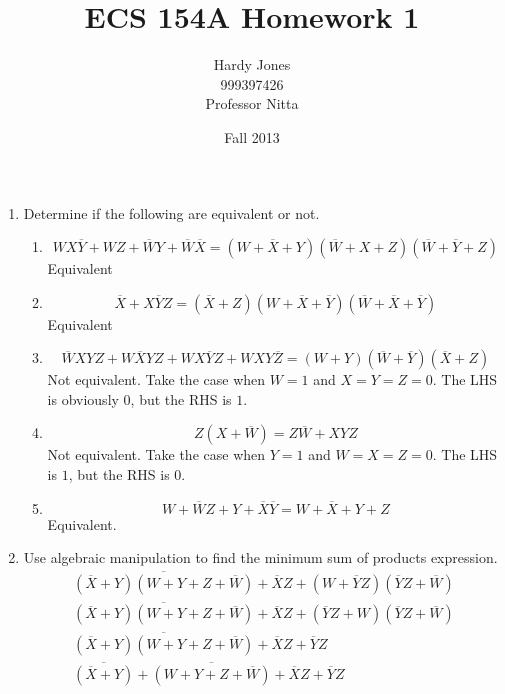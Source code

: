 \documentclass[12pt,letterpaper]{article}
\title{ECS 154A Homework 1\vspace{-2ex}}
\author{Hardy Jones\\
        999397426\\
        Professor Nitta\vspace{-2ex}}
\date{Fall 2013}
\begin{document}
  \maketitle

  \begin{enumerate}
    \item
      Determine if the following are equivalent or not.
      \begin{enumerate}
        \item
          \[
            WX\overline{Y} + WZ + \overline{W}Y + \overline{W} \overline{X} =
            (W + \overline{X} + Y)(\overline{W} + X + Z)(\overline{W} + \overline{Y} + Z)
          \]
          Equivalent
        \item
          \[
            \overline{X} + X\overline{Y}Z =
            (\overline{X} + Z)(W + \overline{X} + \overline{Y})(\overline{W} + \overline{X} + \overline{Y})
          \]
          Equivalent
        \item
          \[
            \overline{W}XYZ + W\overline{X}YZ + WX\overline{Y}Z + WXY\overline{Z} =
            (W + Y)(\overline{W} + \overline{Y})(\overline{X} + Z)
          \]
          Not equivalent.
          Take the case when $W = 1$ and $X = Y = Z = 0$.
          The LHS is obviously $0$, but the RHS is $1$.
        \item
          \[
            Z(X + \overline{W}) = Z\overline{W} + XYZ
          \]
          Not equivalent.
          Take the case when $Y = 1$ and $W = X = Z = 0$.
          The LHS is $1$, but the RHS is $0$.
        \item
          \[
            W + \overline{W}Z + Y + \overline{X}\overline{Y} = W + \overline{X} + Y + Z
          \]
          Equivalent.
      \end{enumerate}
    \item
      Use algebraic manipulation to find the minimum sum of products expression.
      \begin{align*}
        \overline{(\overline{X}+Y)(W+Y+Z+\overline{W})}+\overline{X}Z+(W+\overline{Y}Z)(\overline{Y}Z+\overline{W}) \\
        \overline{(\overline{X}+Y)(W+Y+Z+\overline{W})}+\overline{X}Z+(\overline{Y}Z+W)(\overline{Y}Z+\overline{W}) \tag{Commutativity} \\
        \overline{(\overline{X}+Y)(W+Y+Z+\overline{W})}+\overline{X}Z+\overline{Y}Z \tag{Combining} \\
        \overline{(\overline{X}+Y)}+\overline{(W+Y+Z+\overline{W})}+\overline{X}Z+\overline{Y}Z \tag{De Morgan's} \\

\end{align*}
\end{enumerate}
\end{document}
